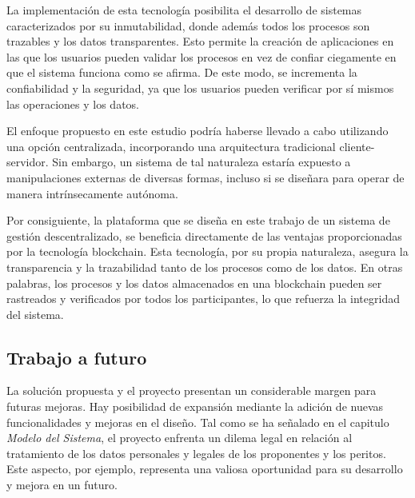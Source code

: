 \bigskip

La implementación de esta tecnología posibilita el desarrollo de sistemas caracterizados por su inmutabilidad, donde además todos los procesos son trazables y los datos transparentes. Esto permite la creación de aplicaciones en las que los usuarios pueden validar los procesos en vez de confiar ciegamente en que el sistema funciona como se afirma. De este modo, se incrementa la confiabilidad y la seguridad, ya que los usuarios pueden verificar por sí mismos las operaciones y los datos.

\bigskip

El enfoque propuesto en este estudio podría haberse llevado a cabo utilizando una opción centralizada, incorporando una arquitectura tradicional cliente-servidor. Sin embargo, un sistema de tal naturaleza estaría expuesto a manipulaciones externas de diversas formas, incluso si se diseñara para operar de manera intrínsecamente autónoma.

\bigskip

Por consiguiente, la plataforma que se diseña en este trabajo de un sistema de gestión descentralizado, se beneficia directamente de las ventajas proporcionadas por la tecnología blockchain. Esta tecnología, por su propia naturaleza, asegura la transparencia y la trazabilidad tanto de los procesos como de los datos. En otras palabras, los procesos y los datos almacenados en una blockchain pueden ser rastreados y verificados por todos los participantes, lo que refuerza la integridad del sistema.

\subsection{Trabajo a futuro}

La solución propuesta y el proyecto presentan un considerable margen para futuras mejoras. Hay posibilidad de expansión mediante la adición de nuevas funcionalidades y mejoras en el diseño. Tal como se ha señalado en el capitulo \textit{Modelo del Sistema}, el proyecto enfrenta un dilema legal en relación al tratamiento de los datos personales y legales de los proponentes y los peritos. Este aspecto, por ejemplo, representa una valiosa oportunidad para su desarrollo y mejora en un futuro.
